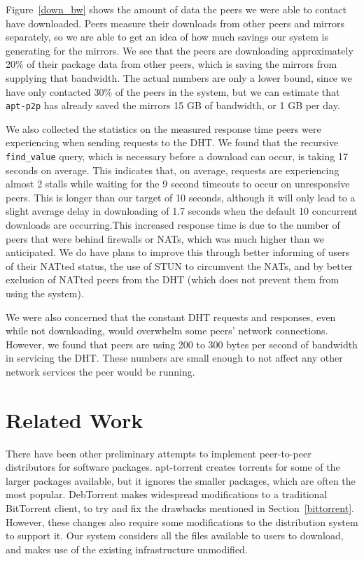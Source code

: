 \documentclass[conference]{IEEEtran}
\begin{document}
Figure~\ref{down_bw} shows the amount of data the peers we were able
to contact have downloaded. Peers measure their downloads from other
peers and mirrors separately, so we are able to get an idea of how
much savings our system is generating for the mirrors. We see that
the peers are downloading approximately 20\% of their package data
from other peers, which is saving the mirrors from supplying that
bandwidth. The actual numbers are only a lower bound, since we have
only contacted 30\% of the peers in the system, but we can estimate
that \texttt{apt-p2p} has already saved the mirrors 15 GB of
bandwidth, or 1 GB per day.

We also collected the statistics on the measured response time peers
were experiencing when sending requests to the DHT. We found that
the recursive \texttt{find\_value} query, which is necessary before
a download can occur, is taking 17 seconds on average. This
indicates that, on average, requests are experiencing almost 2
stalls while waiting for the 9 second timeouts to occur on
unresponsive peers. This is longer than our target of 10 seconds,
although it will only lead to a slight average delay in downloading
of 1.7 seconds when the default 10 concurrent downloads are
occurring.This increased response time is due to the number of peers
that were behind firewalls or NATs, which was much higher than we
anticipated. We do have plans to improve this through better
informing of users of their NATted status, the use of STUN
\cite{STUN} to circumvent the NATs, and by better exclusion of
NATted peers from the DHT (which does not prevent them from using
the system).

We were also concerned that the constant DHT requests and responses,
even while not downloading, would overwhelm some peers' network
connections. However, we found that peers are using 200 to 300 bytes
per second of bandwidth in servicing the DHT. These numbers are
small enough to not affect any other network services the peer would
be running.



\section{Related Work}
\label{related}

There have been other preliminary attempts to implement peer-to-peer distributors for
software packages. apt-torrent \cite{apttorrent} creates torrents
for some of the larger packages available, but it ignores the
smaller packages, which are often the most popular. DebTorrent
\cite{debtorrent} makes widespread modifications to a traditional
BitTorrent client, to try and fix the drawbacks mentioned in
Section~\ref{bittorrent}. However, these changes also require some
modifications to the distribution system to support it. Our system
considers all the files available to users to download, and makes
use of the existing infrastructure unmodified.
\end{document}
